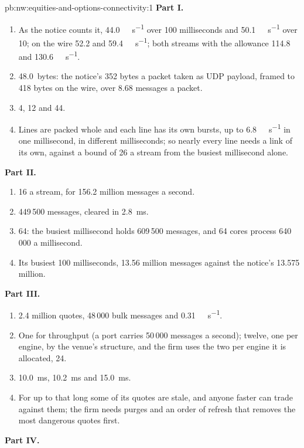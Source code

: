 \begin{solution}{pb:nw:equities-and-options-connectivity:1}
\textbf{Part I.}
\begin{enumerate}
\item As the notice counts it, \qty{44.0}{\giga\bit\per\second} over 100 milliseconds and \qty{50.1}{\giga\bit\per\second} over 10; on the
  wire 52.2 and \qty{59.4}{\giga\bit\per\second}; both streams with the allowance 114.8 and \qty{130.6}{\giga\bit\per\second}.
\item \qty{48.0}{bytes}: the notice's 352 bytes a packet taken as UDP payload, framed to 418 bytes on the wire, over 8.68 messages a packet.
\item 4, 12 and 44.
\item Lines are packed whole and each line has its own bursts, up to \qty{6.8}{\giga\bit\per\second} in one millisecond, in different
  milliseconds; so nearly every line needs a link of its own, against a bound of 26 a stream from the busiest millisecond alone.
\end{enumerate}
\textbf{Part II.}
\begin{enumerate}[resume]
\item 16 a stream, for 156.2 million messages a second.
\item 449\,500 messages, cleared in \qty{2.8}{\milli\second}.
\item 64: the busiest millisecond holds 609\,500 messages, and 64 cores process 640\,000 a millisecond.
\item Its busiest 100 milliseconds, 13.56 million messages against the notice's 13.575 million.
\end{enumerate}
\textbf{Part III.}
\begin{enumerate}[resume]
\item 2.4 million quotes, 48\,000 bulk messages and \qty{0.31}{\giga\bit\per\second}.
\item One for throughput (a port carries 50\,000 messages a second); twelve, one per engine, by the venue's structure, and the firm
  uses the two per engine it is allocated, 24.
\item \qty{10.0}{\milli\second}, \qty{10.2}{\milli\second} and \qty{15.0}{\milli\second}.
\item For up to that long some of its quotes are stale, and anyone faster can trade against them; the firm needs purges and an order
  of refresh that removes the most dangerous quotes first.
\end{enumerate}
\textbf{Part IV.}
\begin{enumerate}[resume]

\end{enumerate}
\end{solution}
